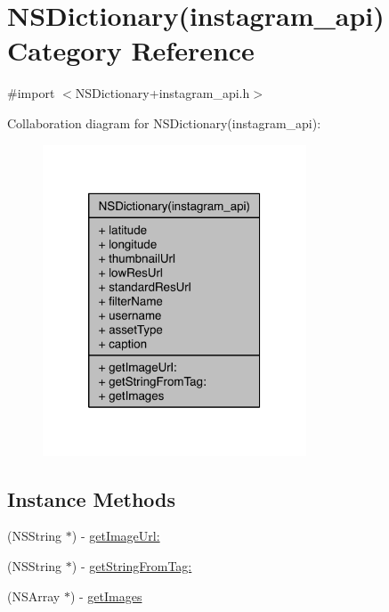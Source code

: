\hypertarget{category_n_s_dictionary_07instagram__api_08}{\section{N\-S\-Dictionary(instagram\-\_\-api) Category Reference}
\label{category_n_s_dictionary_07instagram__api_08}
}


{\ttfamily \#import $<$N\-S\-Dictionary+instagram\-\_\-api.\-h$>$}



Collaboration diagram for N\-S\-Dictionary(instagram\-\_\-api)\-:
\nopagebreak
\begin{figure}[H]
\begin{center}
\leavevmode
\includegraphics[width=222pt]{category_n_s_dictionary_07instagram__api_08__coll__graph}
\end{center}
\end{figure}
\subsection*{Instance Methods}
\begin{DoxyCompactItemize}
\item 
(N\-S\-String $\ast$) -\/ \hyperlink{category_n_s_dictionary_07instagram__api_08_ad82007bf5c25883b81c4256c308d8429}{get\-Image\-Url\-:}
\item 
(N\-S\-String $\ast$) -\/ \hyperlink{category_n_s_dictionary_07instagram__api_08_abc63fd5ed2d2327266d940db7881413e}{get\-String\-From\-Tag\-:}
\item 
(N\-S\-Array $\ast$) -\/ \hyperlink{category_n_s_dictionary_07instagram__api_08_aa53b59d9dd96b0e07948f1ddd7c5b228}{get\-Images}
\end{DoxyCompactItemize}

